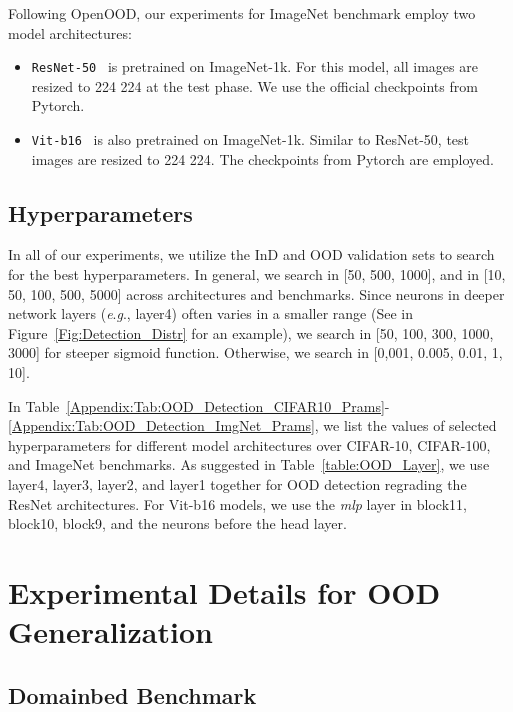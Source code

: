 \documentclass{article} \usepackage{iclr2024_conference,times}
\newcommand{\eg}{\textit{e}.\textit{g}.}
\begin{document}
Following OpenOOD, our experiments for ImageNet benchmark employ two model architectures: 
\begin{itemize}
	\item {\texttt{ResNet-50}}~\citep{tech:ResNet} is pretrained on ImageNet-1k. For this model, all images are resized to 224  224 at the test phase. We use the official checkpoints from Pytorch.

	\item {\texttt{Vit-b16}}~\citep{tech:ViT} is also pretrained on ImageNet-1k. Similar to ResNet-50, test images are resized to 224  224. The checkpoints from Pytorch are employed.

\end{itemize}




\subsection{Hyperparameters}
\label{Appendix:OOD_Detection:HP}
In all of our experiments, we utilize the InD and OOD validation sets to search for the best hyperparameters. In general, we search  in [50, 500, 1000], and  in [10, 50, 100, 500, 5000] across architectures and benchmarks. Since neurons in deeper network layers (\eg, layer4) often varies in a smaller range (See  in Figure~\ref{Fig:Detection_Distr} for an example), we search  in [50, 100, 300, 1000, 3000] for steeper sigmoid function. Otherwise, we search  in [0,001, 0.005, 0.01, 1, 10]. 

In Table~\ref{Appendix:Tab:OOD_Detection_CIFAR10_Prams}-\ref{Appendix:Tab:OOD_Detection_ImgNet_Prams}, we list the values of selected hyperparameters for different model architectures over CIFAR-10, CIFAR-100, and ImageNet benchmarks. As suggested in Table~\ref{table:OOD_Layer}, we use layer4, layer3, layer2, and layer1 together for OOD detection regrading the ResNet architectures. For Vit-b16 models, we use the \textit{mlp} layer in block11, block10, block9, and the neurons before the head layer.












\section{Experimental Details for OOD Generalization}
\label{Appendix:OOD_Generalization_Details}
\subsection{Domainbed Benchmark}
\end{document}
